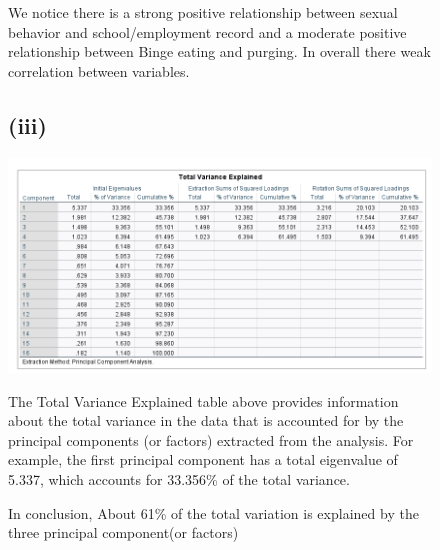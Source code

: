 \documentclass[english,10pt,a4paper]{article}
\begin{document}
\begin{figure}
We notice there is a strong positive relationship between sexual behavior and school/employment record and a moderate positive relationship between Binge eating and purging. In overall there weak correlation between variables.
	
\end{figure}

\begin{figure}
	\subsection*{(iii)}
	\includegraphics[width=1.3\linewidth]{total varience explained.png}
	
The Total Variance Explained table above provides information about the total variance in the data that is accounted for by the principal components (or factors) extracted from the analysis. For example, the first principal component has a total eigenvalue of 5.337, which accounts for 33.356\% of the total variance. 

In conclusion, About 61\% of the total variation is explained by the three principal component(or factors) 
\end{figure}


\end{document}
